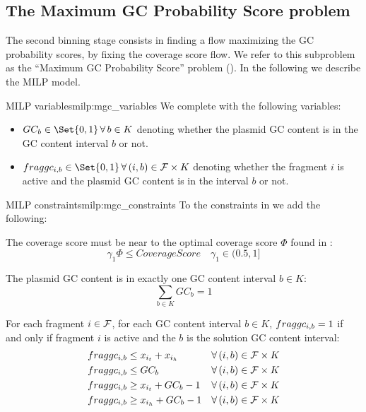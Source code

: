 \subsection{The Maximum GC Probability Score problem \MGC{}}\label{meth:max_gc_score}

The second binning stage consists in finding a flow maximizing the GC probability scores, by fixing the coverage score flow.
We refer to this subproblem as the \enquote{Maximum GC Probability Score} problem (\MGC{}).
In the following we describe the MILP model.

\begin{definition}{\MGC{} MILP variables}{milp:mgc_variables}
  We complete  with the following variables:
  \begin{itemize}
    \item \(GC_b \in \Set{0, 1} \, \forall b \in K\) denoting whether the plasmid GC content is in the GC content interval \(b\) or not.
    \item \(\fraggc{i}{b} \in \Set{0, 1} \, \forall (i, b) \in \Fragments{} \times K\) denoting whether the fragment \(i\) is active and the plasmid GC content is in the interval \(b\) or not.
  \end{itemize}
\end{definition}

\begin{definition}{\MGC{} MILP constraints}{milp:mgc_constraints}
  To the constraints in  we add the following:

  \phantom{text}

  The coverage score must be near to the optimal coverage score \(\Phi{}\) found in \MCF{}:
  \begin{equation}
    \gamma_1 \Phi \leq CoverageScore \quad \gamma_1 \in (0.5, 1]
  \end{equation}

  The plasmid GC content is in exactly one GC content interval \(b \in K\):
  \begin{equation}
    \sum_{b \in K} GC_b = 1
  \end{equation}

  For each fragment \(i \in \mathcal{F}{}\), for each GC content interval \(b \in K\), \(fraggc_{i,b} = 1\) if and only if fragment \(i\) is active and the \(b\) is the solution GC content interval:
  \begin{align}
    \fraggc{i}{b} & \leq x_{i_t} + x_{i_h} & \forall (i, b) \in \Fragments{} \times K \\
    \fraggc{i}{b} & \leq GC_b & \forall (i, b) \in \Fragments{} \times K \\
    \fraggc{i}{b} & \geq x_{i_t} + GC_b - 1 & \forall (i, b) \in \Fragments{} \times K \\
    \fraggc{i}{b} & \geq x_{i_h} + GC_b - 1 & \forall (i, b) \in \Fragments{} \times K
  \end{align}
\end{definition}

